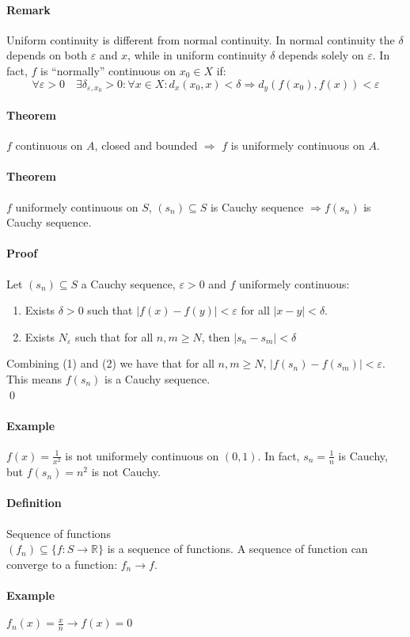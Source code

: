 \documentclass{article}
\newcommand{\abs}[1]{\left|#1\right|}
\newcommand{\func}[3]{#1 : #2 \rightarrow #3}
\newcommand{\R}{\mathbb{R}}
\newcommand{\Ep}{\varepsilon}
\newcommand{\Def}{\paragraph{Definition}}
\newcommand{\Theorem}{\paragraph{Theorem}}
\newcommand{\Remark}{\paragraph{Remark}}
\newcommand{\Proof}{\paragraph{Proof}}
\newcommand{\Example}{\paragraph{Example}}
\begin{document}
  \Remark Uniform continuity is different from normal continuity. In normal
  continuity the $\delta$ depends on both $\Ep$ and $x$, while in uniform
  continuity $\delta$ depends solely on $\Ep$. In fact, $f$ is ``normally''
  continuous on $x_0 \in X$ if:
\begin{equation*}
  \forall \Ep > 0 \quad \exists \delta_{\Ep,x_0} > 0 : \forall x \in X :
  d_x(x_0,x) < \delta \Rightarrow d_y(f(x_0),f(x)) < \Ep
\end{equation*}

  \Theorem $f$ continuous on $A$, closed and bounded $\Rightarrow$ $f$ is
  uniformely continuous on $A$.

  \Theorem $f$ uniformely continuous on $S$, $(s_n) \subseteq S$ is Cauchy
  sequence $\Rightarrow f(s_n)$ is Cauchy sequence.

  \Proof Let $(s_n) \subseteq S$ a Cauchy sequence, $\Ep > 0$ and $f$ uniformely
  continuous:
\begin{enumerate}
  \item Exists $\delta > 0$ such that $\abs{f(x)-f(y)} < \Ep$ for all $\abs{x-y}
  < \delta$.
  \item Exists $N_\Ep$ such that for all $n,m \geq N$, then $\abs{s_n - s_m} <
  \delta$
\end{enumerate}
  Combining (1) and (2) we have that for all $n,m \geq N$, $\abs{f(s_n)-f(s_m)}
  < \Ep$. This means $f(s_n)$ is a Cauchy sequence.
\\\qed

  \Example $f(x) = \frac{1}{x^2}$ is not uniformely continuous on $(0,1)$. In
  fact, $s_n = \frac{1}{n}$ is Cauchy, but $f(s_n) = n^2$ is not Cauchy.

  \Def Sequence of functions
\\$(f_n) \subseteq \{ \func{f}{S}{\R} \}$ is a sequence of functions. A sequence
  of function can converge to a function: $f_n \to f$.

  \Example $f_n(x) = \frac{x}{n} \to f(x) = 0$
\end{document}
